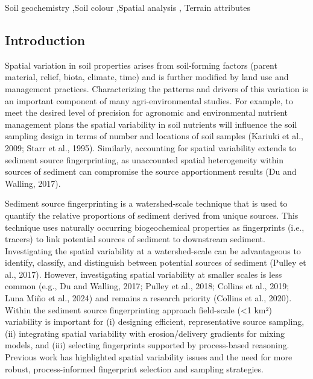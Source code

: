 \documentclass[
  number]{elsarticle}
\begin{document}
\begin{frontmatter}
\begin{keyword}
    Soil geochemistry \sep Soil colour \sep Spatial analysis \sep 
    Terrain attributes
\end{keyword}
\end{frontmatter}
    

\subsection{Introduction}\label{introduction}

Spatial variation in soil properties arises from soil-forming factors
(parent material, relief, biota, climate, time) and is further modified
by land use and management practices. Characterizing the patterns and
drivers of this variation is an important component of many
agri-environmental studies. For example, to meet the desired level of
precision for agronomic and environmental nutrient management plans the
spatial variability in soil nutrients will influence the soil sampling
design in terms of number and locations of soil samples (Kariuki et al.,
2009; Starr et al., 1995). Similarly, accounting for spatial variability
extends to sediment source fingerprinting, as unaccounted spatial
heterogeneity within sources of sediment can compromise the source
apportionment results (Du and Walling, 2017).

Sediment source fingerprinting is a watershed-scale technique that is
used to quantify the relative proportions of sediment derived from
unique sources. This technique uses naturally occurring biogeochemical
properties as fingerprints (i.e., tracers) to link potential sources of
sediment to downstream sediment. Investigating the spatial variability
at a watershed-scale can be advantageous to identify, classify, and
distinguish between potential sources of sediment (Pulley et al., 2017).
However, investigating spatial variability at smaller scales is less
common (e.g., Du and Walling, 2017; Pulley et al., 2018; Collins et al.,
2019; Luna Miño et al., 2024) and remains a research priority (Collins
et al., 2020). Within the sediment source fingerprinting approach
field-scale (\textless1 km²) variability is important for (i) designing
efficient, representative source sampling, (ii) integrating spatial
variability with erosion/delivery gradients for mixing models, and (iii)
selecting fingerprints supported by process-based reasoning. Previous
work has highlighted spatial variability issues and the need for more
robust, process-informed fingerprint selection and sampling strategies.
\end{document}
